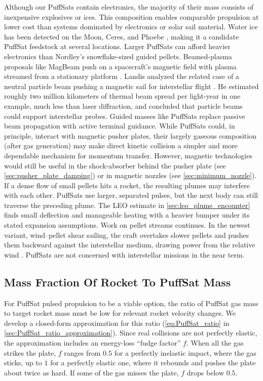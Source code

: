 \documentclass{article}
\begin{document}
Although our PuffSats contain electronics, the majority of their mass consists of inexpensive explosives or ices. This composition enables comparable propulsion at lower cost than systems dominated by electronics or solar sail material. Water ice has been detected on the Moon, Ceres, and Phoebe \cite{colaprete2010lcross,prettyman2017dawn_ceres_water,phoebe}, making it a candidate PuffSat feedstock at several locations.  Larger PuffSats can afford heavier electronics than Nordley's snowflake-sized guided pellets.  Beamed-plasma proposals like MagBeam push on a spacecraft's magnetic field with plasma streamed from a stationary platform \cite{winglee_magbeam}. Landis analyzed the related case of a neutral particle beam pushing a magnetic sail for interstellar flight \cite{landis2004particlebeam}. He estimated roughly two million kilometers of thermal beam spread per light-year in one example, much less than laser diffraction, and concluded that particle beams could support interstellar probes. Guided masses like PuffSats replace passive beam propagation with active terminal guidance. While PuffSats could, in principle, interact with magnetic pusher plates, their largely gaseous composition (after gas generation) may make direct kinetic collision a simpler and more dependable mechanism for momentum transfer.  However, magnetic technologies would still be useful in the shock-absorber behind the pusher plate (see \autoref{sec:pusher_plate_damping}) or in magnetic nozzles (see \autoref{sec:minimum_nozzle}).  If a dense flow of small pellets hits a rocket, the resulting plumes may interfere with each other.   PuffSats use larger, separated pulses, but the next body can still traverse the preceding plume. The LEO estimate in \autoref{sec:leo_plume_encounter} finds small deflection and manageable heating with a heavier bumper under its stated expansion assumptions.  Work on pellet streams continues. In the newest variant, wind--pellet shear sailing, the craft overtakes slower pellets and pushes them backward against the interstellar medium, drawing power from the relative wind \cite{greason2022windpellet}.  PuffSats are not concerned with interstellar missions in the near term.

\subsection{Mass Fraction Of Rocket To PuffSat Mass}\label{sec:mass_fraction}
For PuffSat pulsed propulsion to be a viable option, the ratio of PuffSat gas mass to target rocket mass must be low for relevant rocket velocity changes. We develop a closed-form approximation for this ratio (\autoref{eq:PuffSat_ratio} in \autoref{sec:PuffSat_ratio_approximation}). Since real collisions are not perfectly elastic, the approximation includes an energy-loss ``fudge factor'' $f$. When all the gas strikes the plate, $f$ ranges from $0.5$ for a perfectly inelastic impact, where the gas sticks, up to $1$ for a perfectly elastic one, where it rebounds and pushes the plate about twice as hard. If some of the gas misses the plate, $f$ drops below $0.5$.
\end{document}
